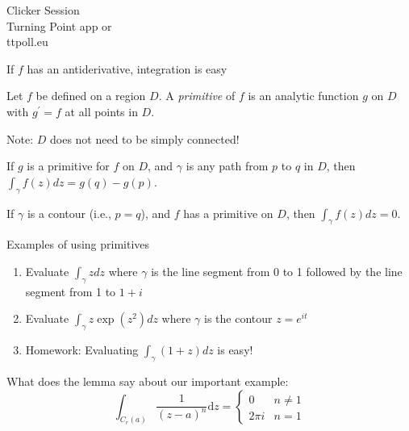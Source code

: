 \documentclass{beamer}
\begin{document}
\begin{frame}
  
\begin{center}

\Huge

Clicker Session \\
Turning Point app or \\
ttpoll.eu 

\end{center}

\end{frame}



\begin{frame}{If $f$ has an antiderivative, integration is easy}
\begin{definition} Let $f$ be defined on a region $D$.  A \emph{primitive} of $f$ is an analytic function $g$ on $D$ with $g^\prime=f$ at \alert{all points in $D$}. \end{definition}
\begin{block}{Note:} $D$ does not need to be simply connected!
\end{block}

\begin{lemma}If $g$ is a primitive for $f$ on $D$, and $\gamma$ is any path from $p$ to $q$ in $D$, then $\int_\gamma f(z)dz=g(q)-g(p)$.
\end{lemma}
\begin{corollary}
If $\gamma$ is a contour (i.e., $p=q$), and $f$ has a primitive on $D$, then $\int_\gamma f(z)dz=0$.
\end{corollary}
\end{frame}
\begin{frame}{Examples of using primitives}
\begin{enumerate}
    \item Evaluate $\int_\gamma zdz$ where $\gamma$ is the line segment from 0 to 1 followed by the line segment from 1 to $1+i$
    \item Evaluate $\int_\gamma z\exp(z^2)dz$ where $\gamma$ is the contour $z=e^{it}$
\item Homework: Evaluating $\int_\gamma (1+z)dz$ is easy!
\end{enumerate}
\begin{block}{What does the lemma say about our important example:}
$$\int_{C_r(a)}\frac{1}{(z-a)^n}\text{d}z=\begin{cases} 0 & n\neq 1 \\ 2\pi i & n=1\end{cases}$$
\end{block}

\end{frame}
\end{document}
